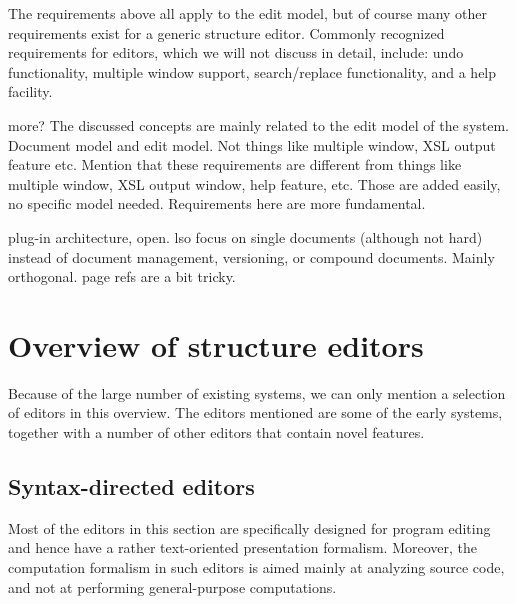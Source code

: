 The requirements above all apply to the edit model, but of course many other requirements exist for a generic structure editor.  Commonly recognized requirements for editors, which we will not discuss in detail, include: undo functionality, multiple window support, search/replace functionality, and a help facility. 

\bc
more?
The discussed concepts are mainly related to the edit model of the system. 
Document model and edit model. Not things like multiple window, XSL output feature etc.
Mention that these requirements are different from things like multiple window, XSL output window, help feature, etc. Those are added easily, no specific model needed. Requirements here are more fundamental.

plug-in architecture, open.
lso focus on single documents (although not hard) 
instead of document management, versioning, or compound documents. Mainly orthogonal.
page refs are a bit tricky.
\ec







%																
%																
%																
\section{Overview of structure editors} \label{sect:overview}

Because of the large number of existing systems, we can only mention a selection of editors in this overview. The editors mentioned are some of the early systems, together with a number of other editors that contain novel features.


%																
\subsection{Syntax-directed editors} \label{sect:synDirEditors}

Most of the editors in this section are specifically designed for program editing and hence have a rather text-oriented presentation formalism. Moreover, the computation formalism in such editors is aimed mainly at analyzing source code, and not at performing general-purpose computations. 

